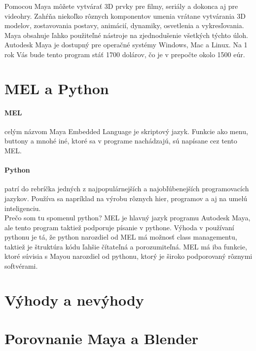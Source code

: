 \documentclass[10pt,oneside,slovak,a4paper]{article}
\begin{document}
Pomocou Maya môžete vytvárať 3D prvky pre filmy, seriály a dokonca aj pre videohry. Zahŕňa niekoľko rôznych komponentov umenia vrátane vytvárania 3D modelov, zostavovania postavy, animácií, dynamiky, osvetlenia a vykresľovania. Maya obsahuje ľahko použiteľné nástroje na zjednodušenie všetkých týchto úloh.\\

Autodesk Maya je dostupný pre operačné systémy Windows, Mac a Linux. Na 1 rok Vás bude tento program stáť 1700 dolárov, čo je v prepočte okolo 1500 eúr.



\section{MEL a Python} \label{python}
\paragraph{MEL}
celým názvom Maya Embedded Language je skriptový jazyk. Funkcie ako menu, buttony a mnohé iné, ktoré sa v programe nachádzajú, sú napísane cez tento MEL.
\paragraph{Python}
patrí do rebríčka jedných z najpopulárnejších a najobľúbenejších programovacích jazykov. Používa sa napríklad na výrobu rôznych hier, programov a aj na umelú inteligenciu.\\

Prečo som tu spomenul python? MEL je hlavný jazyk programu Autodesk Maya, ale tento program taktiež podporuje písanie v pythone. Výhoda v používaní pythonu je tá, že python narozdiel od MEL má možnosť class managementu, taktiež je štruktúra kódu ľahšie čítateľná a porozumiteľná. MEL má iba funkcie, ktoré súvisia s Mayou narozdiel od pythonu, ktorý je široko podporovaný rôznymi softvérami.\cite{evaluationmaya}



\section{Výhody a nevýhody} \label{vyhnevyh}



\section{Porovnanie Maya a Blender} \label{porovnanie}
\end{document}
